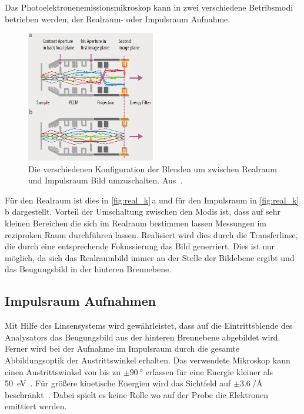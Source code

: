         Das Photoelektronenemissionsmikroskop kann in zwei verschiedene Betribsmodi betrieben werden, der Realraum- oder Impulsraum Aufnahme.
        \begin{figure}
            \centering
            \includegraphics[width=0.5\textwidth]{Real_k.PNG}
            \caption{Die verschiedenen Konfiguration der Blenden um zwischen Realraum und Impulsraum Bild umzuschalten. Aus~\cite{Focus}.}
            \label{fig:real_k}
        \end{figure}
        Für den Realraum ist dies in \autoref{fig:real_k}\,a und für den Impulsraum in \autoref{fig:real_k}\,b dargestellt.
        Vorteil der Umschaltung zwischen den Modis ist, dass auf sehr kleinen Bereichen die sich im Realraum bestimmen lassen Messungen im reziproken Raum durchführen lassen.
        Realisiert wird dies durch die Transferlinse, die durch eine entsprechende Fokussierung das Bild generriert.
        Dies ist nur möglich, da sich das Realraumbild immer an der Stelle der Bildebene ergibt und das Beugungsbild in der hinteren Brennebene.
        

        \subsection{Impulsraum Aufnahmen}
            Mit Hilfe des Linsensystems wird gewährleistet, dass auf die Eintrittsblende des Analysators das Beugungsbild aus der hinteren Brennebene abgebildet wird.
            Ferner wird bei der Aufnahme im Impulsraum durch die gesamte Abbildungsoptik der Austrittswinkel erhalten.
            Das verwendete Mikroskop kann einen Austrittswinkel von bis zu $\pm\SI{90}{\degree}$ erfassen für eine Energie kleiner als \SI{50}{\electronvolt}~\cite{SPECS-MM}.
            Für größere kinetische Energien wird das Sichtfeld auf $\pm\SI[per-mode=reciprocal]{3.6}{\per\angstrom}$ beschränkt~\cite{SPECS-MM}.
            Dabei spielt es keine Rolle wo auf der Probe die Elektronen emittiert werden.

